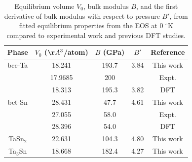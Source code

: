 \newpage
\begin{table}[H]
	\caption{Equilibrium volume $V_{0}$, bulk modulus $B$, and the first derivative of bulk modulus with respect to pressure $B'$, from fitted equilibrium properties from the EOS at 0 $^\circ$K compared to experimental work and previous DFT studies.}
	\centering
	\begin{tabular}{ c c c c c }
		\hline
		Phase & $V_{0}$ ($\AA^3$/atom) & $B$ (GPa) & $B'$ & Reference\\
		\hline
		bcc-Ta & 18.241 & 193.7 & 3.84 & This work\\
		            & 17.9685 & 200 &  & Expt. \cite{Predmore1970}\\
		            & 18.313 & 195.3 & 3.82 & DFT \cite{Shang2010b}\\
	    bct-Sn & 28.431 & 47.7 & 4.61 & This work\\
	               & 27.055 & 58.0 & & Expt. \cite{PeltzeryBlanca1993a}\\
	               & 28.396 & 54.0 & & DFT \cite{PeltzeryBlanca1993a}\\
	 TaSn$_2$ & 22.631 & 104.3 & 4.80 & This work\\
	 Ta$_3$Sn & 18.668 & 182.4 & 4.27 & This work\\
		\hline
	\end{tabular}
	\label{Ch4-table:TaSnvolume}
\end{table}
\clearpage

